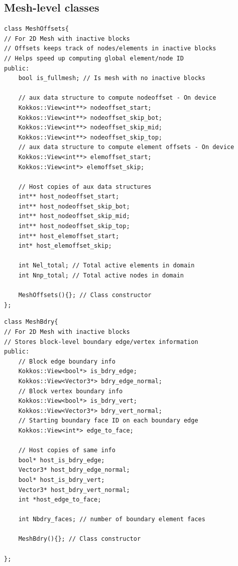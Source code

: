 \documentclass[a4paper,12pt]{article}
\begin{document}
\subsection{Mesh-level classes}
\begin{lstlisting}
class MeshOffsets{
// For 2D Mesh with inactive blocks
// Offsets keeps track of nodes/elements in inactive blocks
// Helps speed up computing global element/node ID 
public:
    bool is_fullmesh; // Is mesh with no inactive blocks

    // aux data structure to compute nodeoffset - On device
    Kokkos::View<int**> nodeoffset_start; 
    Kokkos::View<int**> nodeoffset_skip_bot; 
    Kokkos::View<int**> nodeoffset_skip_mid; 
    Kokkos::View<int**> nodeoffset_skip_top;
    // aux data structure to compute element offsets - On device
    Kokkos::View<int**> elemoffset_start; 
    Kokkos::View<int*> elemoffset_skip; 

    // Host copies of aux data structures
    int** host_nodeoffset_start;
    int** host_nodeoffset_skip_bot;
    int** host_nodeoffset_skip_mid;
    int** host_nodeoffset_skip_top;
    int** host_elemoffset_start;
    int* host_elemoffset_skip;

    int Nel_total; // Total active elements in domain
    int Nnp_total; // Total active nodes in domain

    MeshOffsets(){}; // Class constructor
};
\end{lstlisting}

\begin{lstlisting}
class MeshBdry{
// For 2D Mesh with inactive blocks
// Stores block-level boundary edge/vertex information
public:
    // Block edge boundary info
    Kokkos::View<bool*> is_bdry_edge; 
    Kokkos::View<Vector3*> bdry_edge_normal; 
    // Block vertex boundary info
    Kokkos::View<bool*> is_bdry_vert;  
    Kokkos::View<Vector3*> bdry_vert_normal;
    // Starting boundary face ID on each boundary edge 
    Kokkos::View<int*> edge_to_face; 
	
	// Host copies of same info
    bool* host_is_bdry_edge;
    Vector3* host_bdry_edge_normal;
    bool* host_is_bdry_vert;
    Vector3* host_bdry_vert_normal;
    int *host_edge_to_face;

    int Nbdry_faces; // number of boundary element faces

    MeshBdry(){}; // Class constructor

};
\end{lstlisting}
\end{document}
